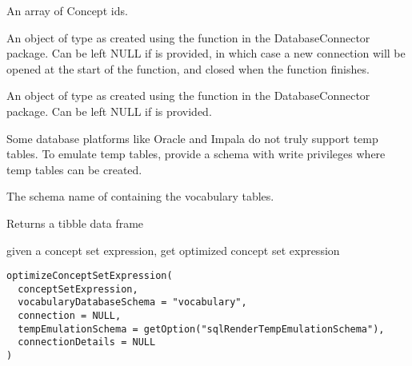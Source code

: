 \documentclass[a4paper]{book}
\begin{document}
\begin{Arguments}
\begin{ldescription}
\item[\code{conceptIds}] An array of Concept ids.

\item[\code{connection}] An object of type  as created using the
 function in the
DatabaseConnector package. Can be left NULL if 
is provided, in which case a new connection will be opened at the start
of the function, and closed when the function finishes.

\item[\code{connectionDetails}] An object of type  as created using the
 function in the
DatabaseConnector package. Can be left NULL if  is
provided.

\item[\code{tempEmulationSchema}] Some database platforms like Oracle and Impala do not truly support temp tables. To emulate temp 
tables, provide a schema with write privileges where temp tables can be created.

\item[\code{vocabularyDatabaseSchema}] The schema name of containing the vocabulary tables.
\end{ldescription}
\end{Arguments}
%
\begin{Value}
Returns a tibble data frame
\end{Value}
%
\begin{Description}\relax
given a concept set expression, get optimized concept set expression
\end{Description}
%
\begin{Usage}
\begin{verbatim}
optimizeConceptSetExpression(
  conceptSetExpression,
  vocabularyDatabaseSchema = "vocabulary",
  connection = NULL,
  tempEmulationSchema = getOption("sqlRenderTempEmulationSchema"),
  connectionDetails = NULL
)
\end{verbatim}
\end{Usage}
%
\end{document}
